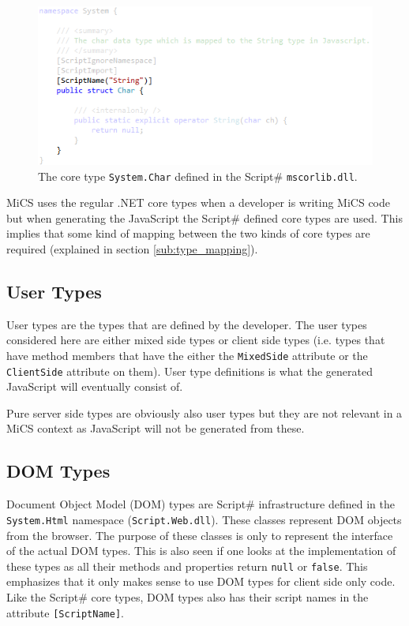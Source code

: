 	\begin{figure}[H]
			\includegraphics[width=13cm]{resources/images/Char.png}
		\caption{The core type \texttt{System.Char} defined in the Script\# \texttt{mscorlib.dll}.}
		\label{char}
	\end{figure}

		MiCS uses the regular .NET core types when a developer is writing MiCS code but when generating the JavaScript the Script\# defined core types are used. This implies that some kind of mapping between the two kinds of core types are required (explained in section \ref{sub:type_mapping}).

	\subsection{User Types} %
	\label{sub:user_types}
		User types are the types that are defined by the developer. The user types considered here are either mixed side types or client side types (i.e. types that have method members that have the either the \texttt{MixedSide} attribute or the \texttt{ClientSide} attribute on them). User type definitions is what the generated JavaScript will eventually consist of. 

		Pure server side types are obviously also user types but they are not relevant in a MiCS context as JavaScript will not be generated from these.

	\subsection{DOM Types} %
	\label{sub:dom_types}
		Document Object Model (DOM) types are Script\# infrastructure defined in the \texttt{System.Html} namespace (\texttt{Script.Web.dll}). These classes represent DOM objects from the browser. The purpose of these classes is only to represent the interface of the actual DOM types. This is also seen if one looks at the implementation of these types as all their methods and properties return \texttt{null} or \texttt{false}. This emphasizes that it only makes sense to use DOM types for client side only code. Like the Script\# core types, DOM types also has their script names in the attribute \texttt{[ScriptName]}.


